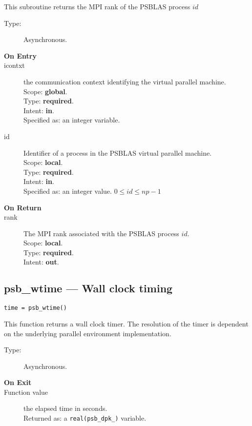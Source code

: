 This subroutine returns the MPI rank of the  PSBLAS process $id$
\begin{description}
\item[Type:] Asynchronous.
\item[\bf  On Entry ]
\item[icontxt] the communication context identifying the virtual
  parallel machine.\\
Scope: {\bf global}.\\
Type: {\bf required}.\\
Intent: {\bf in}.\\
Specified as: an integer variable.
\item[id] Identifier of a   process in the PSBLAS virtual parallel machine.\\
Scope: {\bf local}.\\
Type: {\bf required}.\\
Intent: {\bf in}.\\
Specified as: an integer value. $0 \le id \le np-1$\
\end{description}

\begin{description}
\item[\bf On Return]
\item[rank] The MPI rank associated with the  PSBLAS process $id$.\\
Scope: {\bf local}.\\
Type: {\bf required}.\\
Intent: {\bf out}.\\
\end{description}




\clearpage\subsection*{psb\_wtime --- Wall clock timing}

\begin{verbatim}
time = psb_wtime()
\end{verbatim}

This function returns a wall clock timer. The resolution of the timer
is dependent on the underlying parallel environment implementation.
\begin{description}
\item[Type:] Asynchronous.
\item[\bf  On Exit ]
\item[Function value] the elapsed time in seconds.\\
Returned  as: a  \verb|real(psb_dpk_)|  variable.
\end{description}


